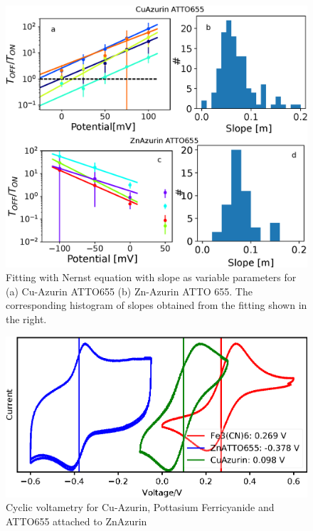 \documentclass[11pt,a4paper,onecolumn]{article}
\begin{document}
\begin{figure}
  \centering
  \includegraphics[width=\textwidth,keepaspectratio]{Figure_SI/SI_potential_slope.eps}
	\makeatletter
	\renewcommand{\fnum@figure}{\figurename~S\thefigure}
	\makeatother
  \caption{Fitting with Nernst equation with slope as variable parameters for  (a) Cu-Azurin ATTO655 (b) Zn-Azurin ATTO 655. The corresponding histogram of slopes obtained from the fitting shown in the right.}
  \label{SIfig:potential_slope}
\end{figure}
\begin{figure}
  \centering
  \includegraphics{Figure_SI/cyclic_voltametry.eps}
  \makeatletter
  \renewcommand{\fnum@figure}{\figurename~S\thefigure}
  \makeatother
  \caption{Cyclic voltametry for Cu-Azurin, Pottasium Ferricyanide and ATTO655 attached to ZnAzurin}
  \label{SIfig: cyclic_voltametry}
\end{figure}

%
\end{document}
